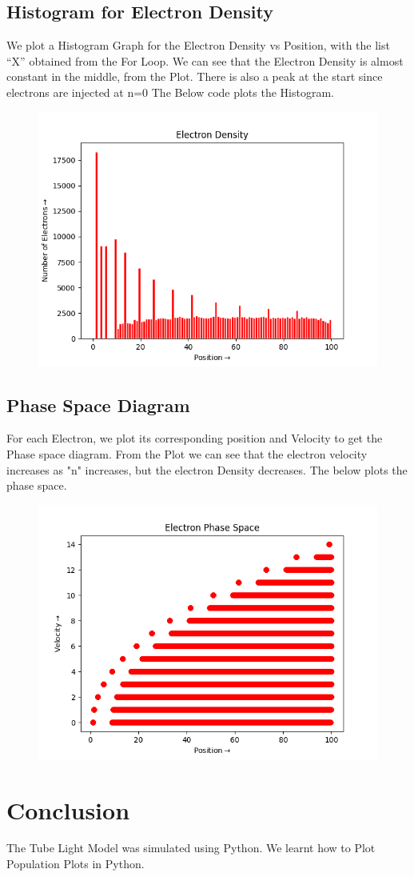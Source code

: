 \documentclass[12pt, a4paper]{report}
\begin{document}
\subsection{Histogram for Electron Density}
We plot a Histogram Graph for the Electron Density vs Position, with the list “X” obtained from the For Loop. We can see that the Electron Density is almost constant in the middle, from the Plot. There is also a peak at the start since electrons are injected at n=0  The Below code plots the Histogram. 
\noindent

\begin{figure}[h!]
    \centering
    \includegraphics[scale=0.6]{fig2.png} 
    \caption{}
    \label{fig:my_label}
\end{figure}
\subsection{Phase Space Diagram}
For each Electron, we plot its corresponding position and Velocity to get the Phase space diagram. From the Plot we can see that the electron velocity increases as "n" increases, but the electron Density decreases. The below plots the phase space.
\noindent

\begin{figure}[h!]
    \centering
    \includegraphics[scale=0.6]{fig3.png} 
    \caption{}
    \label{fig:my_label}
\end{figure}

\section{Conclusion}
The Tube Light Model was simulated using Python. We learnt how to Plot Population Plots in Python.
\end{document}
